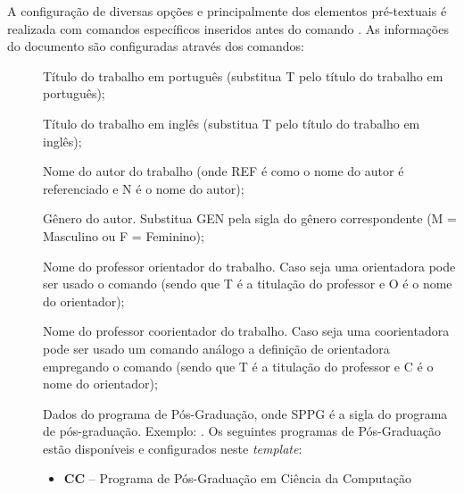 A configuração de diversas opções e principalmente dos elementos pré-textuais é realizada com comandos específicos inseridos antes do comando . As informações do documento são configuradas através dos comandos:

\begin{description}

 \item[] Título do trabalho em português (substitua T pelo título do trabalho em português);
 
 \item[] Título do trabalho em inglês (substitua T pelo título do trabalho em inglês);

 \item[] Nome do autor do trabalho (onde REF é como o nome do autor é referenciado e N é o nome do autor);
 
  \item[] Gênero do autor. Substitua GEN pela sigla do gênero correspondente (M = Masculino ou F = Feminino);

 \item[] Nome do professor orientador do trabalho. Caso seja uma orientadora pode ser usado o comando  (sendo que T é a titulação do professor e O é o nome do orientador);

 \item[] Nome do professor coorientador do trabalho. Caso seja uma coorientadora pode ser usado um comando análogo a definição de orientadora  empregando o comando (sendo que T é a titulação do professor e C é o nome do orientador);

 
 \item[] Dados do programa de Pós-Graduação, onde SPPG é a sigla do programa de pós-graduação. Exemplo: . Os seguintes programas de Pós-Graduação estão disponíveis e configurados neste \textit{template}:
    \begin{itemize}
        \item \textbf{CC} -- Programa de Pós-Graduação em Ciência da Computação
    \end{itemize}
 

\end{description}
